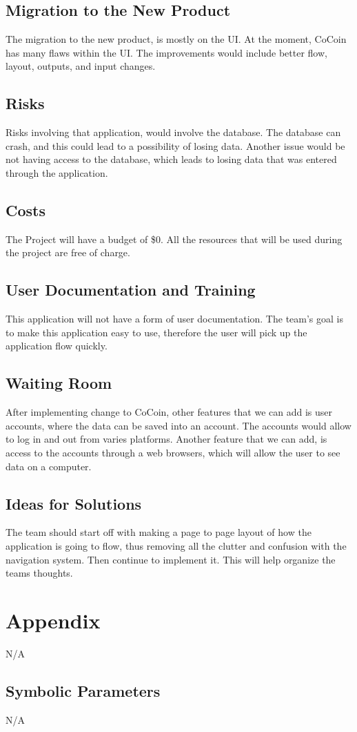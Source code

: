 \documentclass[12pt, titlepage]{article}
\begin{document}
\subsection{Migration to the New Product}
The migration to the new product, is mostly on the UI. At the moment, CoCoin has many flaws within the UI. The improvements would include better flow, layout, outputs, and input changes. 
\subsection{Risks}
Risks involving that application, would involve the database. The database can crash, and this could lead to a possibility of losing data. Another issue would be not having access to the database, which leads to losing data that was entered through the application. %
\subsection{Costs}
The Project will have a budget of \$0. All the resources that will be used during the project are free of charge. 
\subsection{User Documentation and Training}
This application will not have a form of user documentation. The team’s goal is to make this application easy to use, therefore the user will pick up the application flow quickly. 
\subsection{Waiting Room}
After implementing change to CoCoin, other features that we can add is user accounts, where the data can be saved into an account. The accounts would allow to log in and out from varies platforms. Another feature that we can add, is access to the accounts through a web browsers, which will allow the user to see data on a computer. 
\subsection{Ideas for Solutions}
The team should start off with making a page to page layout of how the application is going to flow, thus removing all the clutter and confusion with the navigation system. Then continue to implement it. This will help organize the teams thoughts.




\newpage

\section{Appendix}
N/A

\subsection{Symbolic Parameters}
N/A
\end{document}
